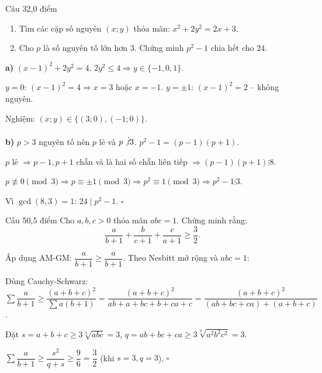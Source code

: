 \begin{de_cau}{Câu 3}{2,0 điểm}
\begin{enumerate}[label=\alph*)]
  \item Tìm các cặp số nguyên $(x;y)$ thỏa mãn: $x^2 + 2y^2 = 2x + 3$.
  \item Cho $p$ là số nguyên tố lớn hơn 3. Chứng minh $p^2-1$ chia hết cho $24$.
\end{enumerate}
\end{de_cau}

\begin{loi_giai_cau}
\textbf{a)} $(x-1)^2+2y^2=4$. $2y^2\le4\Rightarrow y\in\{-1,0,1\}$.

$y=0$: $(x-1)^2=4\Rightarrow x=3$ hoặc $x=-1$.
$y=\pm1$: $(x-1)^2=2$ -- không nguyên.

Nghiệm: $(x;y)\in\{(3;0),(-1;0)\}$.

\textbf{b)} $p>3$ nguyên tố nên $p$ lẻ và $p\not\vdots3$. $p^2-1=(p-1)(p+1)$.

$p$ lẻ $\Rightarrow p-1,p+1$ chẵn và là hai số chẵn liên tiếp $\Rightarrow(p-1)(p+1)\vdots8$.

$p\not\equiv0\pmod3\Rightarrow p\equiv\pm1\pmod3\Rightarrow p^2\equiv1\pmod3\Rightarrow p^2-1\vdots3$.

Vì $\gcd(8,3)=1$: $24\mid p^2-1$. $\square$
\end{loi_giai_cau}

\begin{de_cau}{Câu 5}{0,5 điểm}
Cho $a, b, c > 0$ thỏa mãn $abc = 1$. Chứng minh rằng:
\[\dfrac{a}{b+1} + \dfrac{b}{c+1} + \dfrac{c}{a+1} \ge \dfrac{3}{2}.\]
\end{de_cau}

\begin{loi_giai_cau}
Áp dụng AM-GM: $\dfrac{a}{b+1}\ge\dfrac{a}{b+1}$. Theo Nesbitt mở rộng và $abc=1$:

Dùng Cauchy-Schwarz: $\displaystyle\sum\dfrac{a}{b+1}\ge\dfrac{(a+b+c)^2}{\sum a(b+1)}=\dfrac{(a+b+c)^2}{ab+a+bc+b+ca+c}=\dfrac{(a+b+c)^2}{(ab+bc+ca)+(a+b+c)}$.

Đặt $s=a+b+c\ge3\sqrt[3]{abc}=3$, $q=ab+bc+ca\ge3\sqrt[3]{a^2b^2c^2}=3$.

$\displaystyle\sum\dfrac{a}{b+1}\ge\dfrac{s^2}{q+s}\ge\dfrac{9}{6}=\dfrac{3}{2}$ (khi $s=3,q=3$). $\square$
\end{loi_giai_cau}
